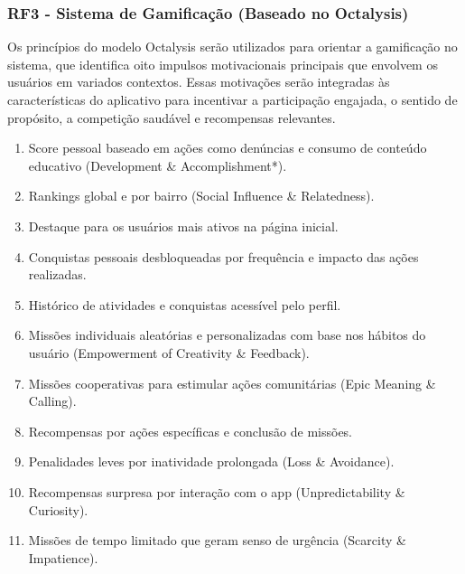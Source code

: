 \documentclass[a5paper, 12pt]{article}
\begin{document}
    \subsubsection{RF3 - Sistema de Gamificação (Baseado no Octalysis)}
    Os princípios do modelo Octalysis serão utilizados para orientar a gamificação no sistema, que identifica oito impulsos motivacionais principais que envolvem os usuários em variados contextos. Essas motivações serão integradas às características do aplicativo para incentivar a participação engajada, o sentido de propósito, a competição saudável e recompensas relevantes.
    \begin{enumerate}
        \item Score pessoal baseado em ações como denúncias e consumo de conteúdo educativo (Development \& Accomplishment*).
        \item Rankings global e por bairro (Social Influence \& Relatedness).
        \item Destaque para os usuários mais ativos na página inicial.
        \item Conquistas pessoais desbloqueadas por frequência e impacto das ações realizadas.
        \item Histórico de atividades e conquistas acessível pelo perfil.
        \item Missões individuais aleatórias e personalizadas com base nos hábitos do usuário (Empowerment of Creativity \& Feedback).
        \item Missões cooperativas para estimular ações comunitárias (Epic Meaning \& Calling).
        \item Recompensas por ações específicas e conclusão de missões.
        \item Penalidades leves por inatividade prolongada (Loss \& Avoidance).
        \item Recompensas surpresa por interação com o app (Unpredictability \& Curiosity).
        \item Missões de tempo limitado que geram senso de urgência (Scarcity \& Impatience).
    \end{enumerate}
    
    
    
\end{document}
